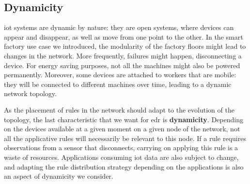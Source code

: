 \documentclass{iosart2c}
\begin{document}
%
%
%

\subsection{Dynamicity}

\gls{iot} systems are dynamic by nature: they are open systems, where devices can appear and disappear, as well as move from one point to the other. 
In the smart factory use case we introduced, the modularity of the factory floors might lead to changes in the network.
More frequently, failures might happen, disconnecting a device. 
For energy saving purposes, not all the machines might also be powered permanently.
Moreover, some devices are attached to workers that are mobile: they will be connected to different machines over time, leading to a dynamic network topology.

As the placement of rules in the network should adapt to the evolution of the topology, the last characteristic that we want for \gls{edr} is \textbf{dynamicity}.
Depending on the devices available at a given moment on a given node of the network, not all the applicative rules will necessarily be relevant to this node.
If a rule requires observations from a sensor that disconnects, carrying on applying this rule is a waste of resources. 
Applications consuming \gls{iot} data are also subject to change, and adapting the rule distribution strategy depending on the applications is also an aspect of dynamicity we consider.
\end{document}
